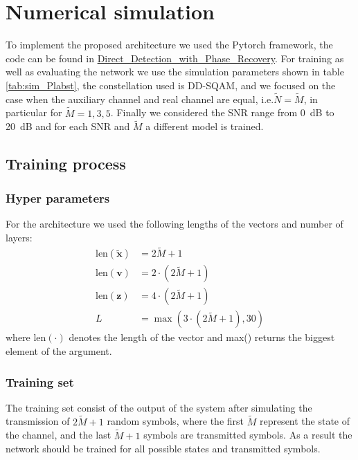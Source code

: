 \section{Numerical simulation}

To implement the proposed architecture we used the Pytorch framework, the code can be found in \href{https://github.com/dfigueroa11/Direct_Detection_with_Phase_Recovery.git}{Direct\_Detection\_with\_Phase\_Recovery}. For training as well as evaluating the network we use the simulation parameters shown in table \ref{tab:sim_Plabst}, the constellation used is DD-SQAM, and we focused on the case when the auxiliary channel and real channel are equal, i.e.$\widetilde{N}=\widetilde{M}$, in particular  for $\widetilde{M}=1,3,5$. Finally we considered the SNR range from \SI{0}{dB} to \SI{20}{dB} and for each SNR and $\widetilde{M}$ a different model is trained.

\subsection{Training process}

\subsubsection{Hyper parameters}

For the architecture we used the following lengths of the vectors and number of layers:
\begin{align}
	\text{len}(\tilde{\bm x})&=2\widetilde{M}+1\\
	\text{len}(\bm v)&=2\cdot(2\widetilde{M}+1)\\
	\text{len}(\bm z)&=4\cdot(2\widetilde{M}+1)\\
	L&=\max(3\cdot(2\widetilde{M}+1),30)
\end{align}
where len$(\cdot)$ denotes the length of the vector and max() returns the biggest element of the argument.

\subsubsection{Training set}

The training set consist of the output of the system after simulating the transmission of $2\widetilde{M}+1$ random symbols, where the first $\widetilde{M}$ represent the state of the channel, and the last $\widetilde{M}+1$ symbols are transmitted symbols. As a result the network should be trained for all possible states and transmitted symbols.\\

